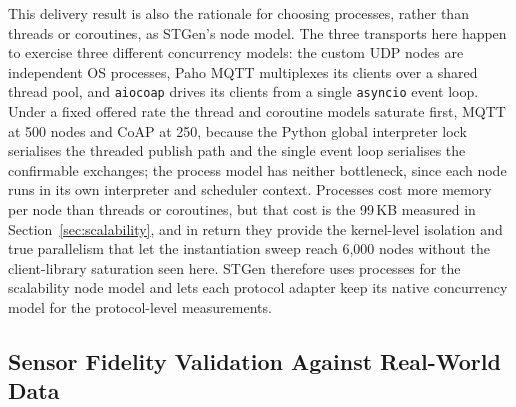 \documentclass[jsan,article,submit,moreauthors,pdftex]{Definitions/mdpi}
\begin{document}
This delivery result is also the rationale for choosing processes, rather than threads or coroutines, as STGen's node model. The three transports here happen to exercise three different concurrency models: the custom UDP nodes are independent OS processes, Paho MQTT multiplexes its clients over a shared thread pool, and \texttt{aiocoap} drives its clients from a single \texttt{asyncio} event loop. Under a fixed offered rate the thread and coroutine models saturate first, MQTT at 500 nodes and CoAP at 250, because the Python global interpreter lock serialises the threaded publish path and the single event loop serialises the confirmable exchanges; the process model has neither bottleneck, since each node runs in its own interpreter and scheduler context. Processes cost more memory per node than threads or coroutines, but that cost is the 99\,KB measured in Section~\ref{sec:scalability}, and in return they provide the kernel-level isolation and true parallelism that let the instantiation sweep reach 6{,}000 nodes without the client-library saturation seen here. STGen therefore uses processes for the scalability node model and lets each protocol adapter keep its native concurrency model for the protocol-level measurements.

\subsection{Sensor Fidelity Validation Against Real-World Data}
\label{sec:fidelity}
\end{document}
